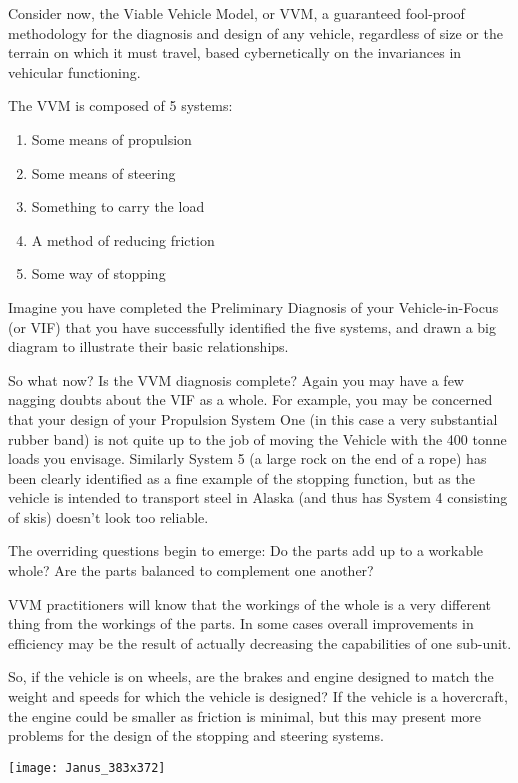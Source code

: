 Consider now, the Viable Vehicle Model, or VVM, a guaranteed fool-proof methodology for the diagnosis and design of any vehicle, regardless of size or the terrain on which it must travel, based cybernetically on the invariances in vehicular functioning.

The VVM is composed of 5 systems:

\begin{enumerate}
  \item Some means of propulsion
  \item Some means of steering
  \item Something to carry the load
  \item A method of reducing friction
  \item Some way of stopping
\end{enumerate}

Imagine you have completed the Preliminary Diagnosis of your Vehicle-in-Focus (or VIF) that you have successfully identified the five systems, and drawn a big diagram to illustrate their basic relationships.

So what now? Is the VVM diagnosis complete? Again you may have a few nagging doubts about the VIF as a whole. For example, you may be concerned that your design of your Propulsion System One (in this case a very substantial rubber band) is not quite up to the job of moving the Vehicle with the 400 tonne loads you envisage. Similarly System 5 (a large rock on the end of a rope) has been clearly identified as a fine example of the stopping function, but as the vehicle is intended to transport steel in Alaska (and thus has System 4 consisting of skis) doesn't look too reliable.

The overriding questions begin to emerge: Do the parts add up to a workable whole? Are the parts balanced to complement one another?

VVM practitioners will know that the workings of the whole is a very different thing from the workings of the parts. In some cases overall improvements in efficiency may be the result of actually decreasing the capabilities of one sub-unit.

So, if the vehicle is on wheels, are the brakes and engine designed to match the weight and speeds for which the vehicle is designed? If the vehicle is a hovercraft, the engine could be smaller as friction is minimal, but this may present more problems for the design of the stopping and steering systems.

\begin{center}
\texttt{[image: Janus\_383x372]}
\end{center}

